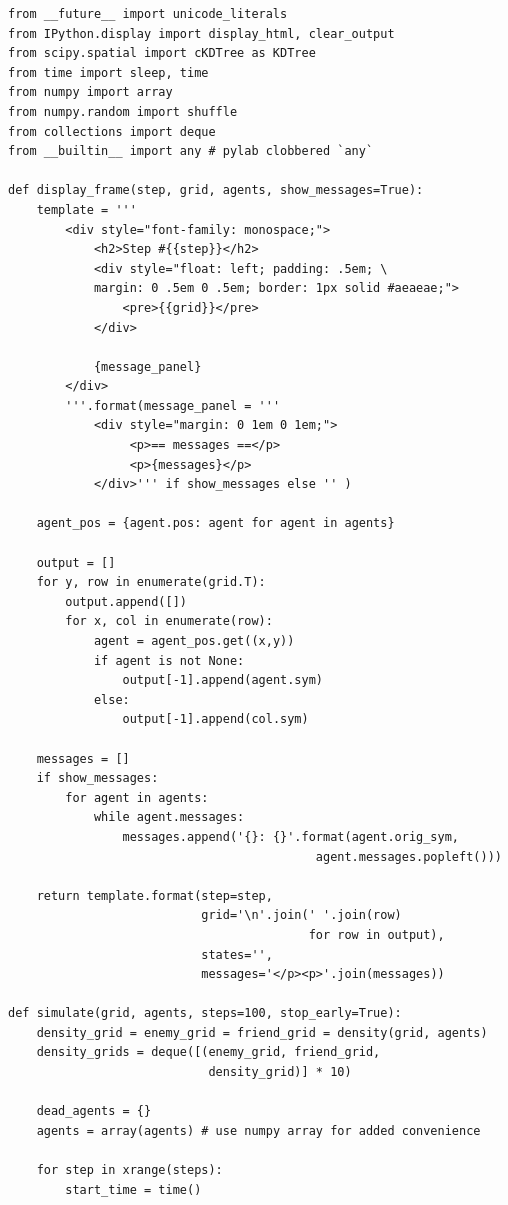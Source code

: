 \begin{verbatim}
from __future__ import unicode_literals
from IPython.display import display_html, clear_output
from scipy.spatial import cKDTree as KDTree
from time import sleep, time
from numpy import array
from numpy.random import shuffle
from collections import deque
from __builtin__ import any # pylab clobbered `any`

def display_frame(step, grid, agents, show_messages=True):
    template = '''
        <div style="font-family: monospace;">
            <h2>Step #{{step}}</h2>
            <div style="float: left; padding: .5em; \
            margin: 0 .5em 0 .5em; border: 1px solid #aeaeae;">
                <pre>{{grid}}</pre>
            </div>

            {message_panel}
        </div>
        '''.format(message_panel = '''
            <div style="margin: 0 1em 0 1em;">
                 <p>== messages ==</p>
                 <p>{messages}</p>
            </div>''' if show_messages else '' )

    agent_pos = {agent.pos: agent for agent in agents}
    
    output = []
    for y, row in enumerate(grid.T):
        output.append([])
        for x, col in enumerate(row):
            agent = agent_pos.get((x,y))
            if agent is not None:
                output[-1].append(agent.sym)
            else:
                output[-1].append(col.sym)
    
    messages = []
    if show_messages:
        for agent in agents:
            while agent.messages:
                messages.append('{}: {}'.format(agent.orig_sym,
                                           agent.messages.popleft()))
    
    return template.format(step=step,
                           grid='\n'.join(' '.join(row) 
                                          for row in output), 
                           states='', 
                           messages='</p><p>'.join(messages))

def simulate(grid, agents, steps=100, stop_early=True):
    density_grid = enemy_grid = friend_grid = density(grid, agents)
    density_grids = deque([(enemy_grid, friend_grid,
                            density_grid)] * 10)
    
    dead_agents = {}
    agents = array(agents) # use numpy array for added convenience
    
    for step in xrange(steps):
        start_time = time()
        

\end{verbatim}
